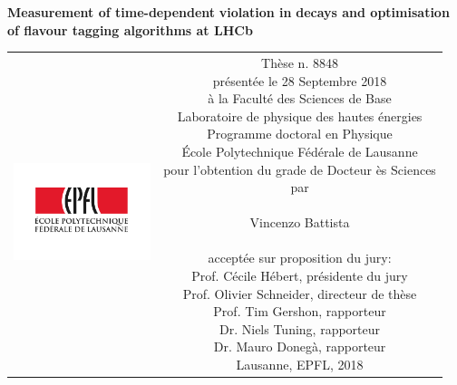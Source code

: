 \begin{titlepage}
\begin{center}
\sffamily


\null\vspace{2cm}
{\huge \textbf{Measurement of time-dependent}  \textbf{violation in}  \textbf{decays and optimisation of flavour tagging algorithms at LHCb} } \\
    
\vfill

\begin{tabular} {cc}
\parbox{0.3\textwidth}{\includegraphics[width=4cm]{images/epfl}}
&
\parbox{0.7\textwidth}{%
	Th\`ese n. 8848\\
	pr\'esent\'ee le 28 Septembre 2018\\
         \`a la Facult\'e des Sciences de Base\\
	Laboratoire de physique des hautes \'energies \\
	Programme doctoral en Physique\\
        \'Ecole Polytechnique F\'ed\'erale de Lausanne\\
	
	pour l'obtention du grade de Docteur \`es Sciences\\
	par\\ 
	\\
	\null \hspace{3em} Vincenzo Battista\\
%
\\

\small
accept\'ee sur proposition du jury:\\
%
    Prof.  C\'ecile H\'ebert, pr\'esidente du jury\\
    Prof.  Olivier Schneider, directeur de th\`ese\\
    Prof.  Tim Gershon, rapporteur\\
    Dr.    Niels Tuning, rapporteur\\
    Dr.    Mauro Doneg\`a, rapporteur\\
%


Lausanne, EPFL, 2018}
\end{tabular}
\end{center}
\vspace{2cm}
\end{titlepage}



